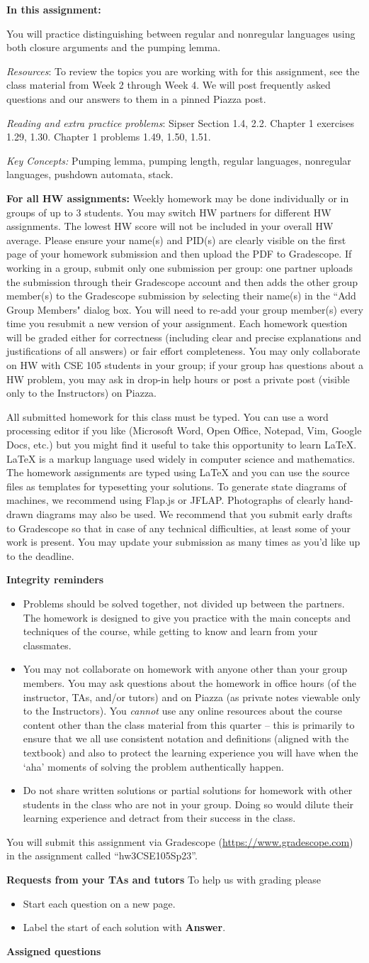 \documentclass[12pt, oneside]{article}
\newcommand{\instructions}{{\bf For all HW assignments:} Weekly homework 
may be done individually or in groups of up to 3 students. 
You may switch HW partners for different HW assignments. 
The lowest HW score will not be included in your overall HW average. 
Please ensure your name(s) and PID(s) are clearly visible on the first page of your homework submission 
and then upload the PDF to Gradescope. If working in a group, submit only one submission per group: 
one partner uploads the submission through their Gradescope account and then adds the other group member(s) 
to the Gradescope submission by selecting their name(s) in the ``Add Group Members" dialog box. 
You will need to re-add your group member(s) every time you resubmit a new version of your assignment.
 Each homework question will be graded either for correctness (including clear and precise explanations and 
 justifications of all answers) or fair effort completeness. You may only collaborate on HW with CSE 105 students 
 in your group; if your group has questions about a HW problem, you may ask in drop-in help hours or post a private 
 post (visible only to the Instructors) on Piazza.

All submitted homework for this class must be typed. 
You can use a word processing editor if you like (Microsoft Word, Open Office, Notepad, Vim, Google Docs, etc.) 
but you might find it useful to take this opportunity to learn LaTeX. 
LaTeX is a markup language used widely in computer science and mathematics. 
The homework assignments are typed using LaTeX and you can use the source files 
as templates for typesetting your solutions.
To generate state diagrams of machines, we recommend using Flap.js
or JFLAP. Photographs of clearly hand-drawn diagrams may also be used. We recommend that you
submit early drafts to Gradescope so that in case of any technical difficulties, at least some of your
work is present. You may update your submission as many times as you'd like up to the deadline.


{\bf Integrity reminders}
\begin{itemize}
\item Problems should be solved together, not divided up between the partners. The homework is
designed to give you practice with the main concepts and techniques of the course, 
while getting to know and learn from your classmates.
\item You may not collaborate on homework with anyone other than your group members.
You may ask questions about the homework in office hours (of the instructor, TAs, and/or tutors) and 
on Piazza (as private notes viewable only to the Instructors).  
You \emph{cannot} use any online resources about the course content other than the class material 
from this quarter -- this is primarily to ensure that we all use consistent notation and
definitions (aligned with the textbook) and also to protect the learning experience you will have when
the `aha' moments of solving the problem authentically happen.
\item Do not share written solutions or partial solutions for homework with 
other students in the class who are not in your group. Doing so would dilute their learning 
experience and detract from their success in the class.
\end{itemize}

}
\begin{document}
\maketitle
\thispagestyle{fancy}

\textbf{In this assignment:}

You will practice distinguishing between regular and nonregular languages using both 
closure arguments and the pumping lemma.

\textit{Resources}: To review the topics you are working with for this assignment, 
see the class material from Week 2 through Week 4. We will post frequently asked questions 
and our answers to them in a pinned Piazza post.

\textit{Reading and extra practice problems}: Sipser Section 1.4, 2.2. Chapter 1 
exercises 1.29, 1.30. Chapter 1 problems 1.49, 1.50, 1.51.

\textit{Key Concepts:} Pumping lemma, pumping length, regular languages, nonregular languages, 
pushdown automata, stack.

\instructions

You will submit this assignment via Gradescope
(\href{https://www.gradescope.com}{https://www.gradescope.com}) 
in the assignment called ``hw3CSE105Sp23''.

\textbf{Requests from your TAs and tutors}
To help us with grading please 
\begin{itemize}
    \item Start each question on a new page.
    \item Label the start of each solution with {\bf Answer}.
\end{itemize}

\textbf{Assigned questions}
\end{document}

